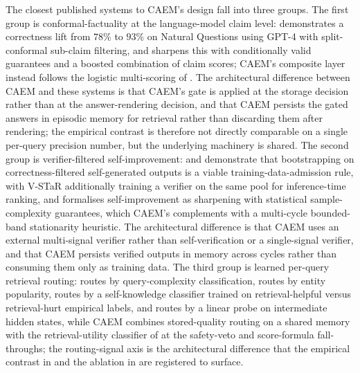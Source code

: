 The closest published systems to CAEM's design fall into three groups. The first group is conformal-factuality at the language-model claim level: \cite{mohri2024conformal} demonstrates a correctness lift from $78\%$ to $93\%$ on Natural Questions using GPT-4 with split-conformal sub-claim filtering, and \cite{cherian2024conformal} sharpens this with conditionally valid guarantees and a boosted combination of claim scores; CAEM's composite layer instead follows the logistic multi-scoring of \cite{valentin2024hallucination}. The architectural difference between CAEM and these systems is that CAEM's gate is applied at the storage decision rather than at the answer-rendering decision, and that CAEM persists the gated answers in episodic memory for retrieval rather than discarding them after rendering; the empirical contrast is therefore not directly comparable on a single per-query precision number, but the underlying machinery is shared. The second group is verifier-filtered self-improvement: \cite{NEURIPS2022_639a9a17} and \cite{hosseini2024vstar} demonstrate that bootstrapping on correctness-filtered self-generated outputs is a viable training-data-admission rule, with V-STaR additionally training a verifier on the same pool for inference-time ranking, and \cite{huang2025sharpening} formalises self-improvement as sharpening with statistical sample-complexity guarantees, which CAEM's  complements with a multi-cycle bounded-band stationarity heuristic. The architectural difference is that CAEM uses an external multi-signal verifier rather than self-verification or a single-signal verifier, and that CAEM persists verified outputs in memory across cycles rather than consuming them only as training data. The third group is learned per-query retrieval routing: \cite{jeong2024adaptive} routes by query-complexity classification, \cite{mallen2023whennot} routes by entity popularity, \cite{wang2023skr} routes by a self-knowledge classifier trained on retrieval-helpful versus retrieval-hurt empirical labels, and \cite{baek2025probing} routes by a linear probe on intermediate hidden states, while CAEM combines stored-quality routing on a shared memory with the retrieval-utility classifier of  at the safety-veto and score-formula fall-throughs; the routing-signal axis is the architectural difference that the empirical contrast in  and the ablation in  are registered to surface.

